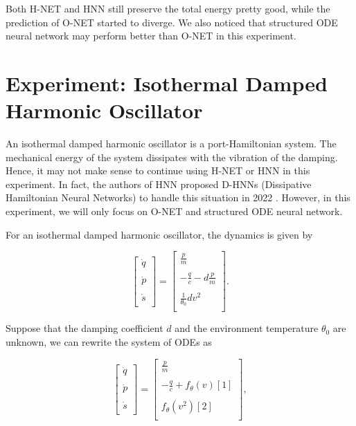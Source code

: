 \documentclass[
	parskip, 			   %
	twoside, 			   %
	DIV=14, 			   %
	BCOR=15.0mm, 		   %
	headsepline, 		   %
	open=right, 		   %
	captions=tableheading, %
	bibliography=totoc,    %
	numbers=noenddot       %
]{scrreprt}
\begin{document}
Both H-NET and HNN still preserve the total energy pretty good, while the prediction of O-NET started to diverge. We also noticed that structured ODE neural network may perform better than O-NET in this experiment.


\clearpage
\section{Experiment: Isothermal Damped Harmonic Oscillator}
An isothermal damped harmonic oscillator is a port-Hamiltonian system. The mechanical energy of the system dissipates with the vibration of the damping. Hence, it may not make sense to continue using H-NET or HNN in this experiment. In fact, the authors of HNN proposed D-HNNs (Dissipative Hamiltonian Neural Networks) to handle this situation in 2022 \cite{greydanus2022dissipative}. However, in this experiment, we will only focus on O-NET and structured ODE neural network.

For an isothermal damped harmonic oscillator, the dynamics is given by

\begin{equation}
    \label{eq:ODE_idho}
    \begin{bmatrix}
    \dot{q}\\
    \\
    \dot{p}\\
    \\
    \dot{s}\\
    \end{bmatrix}
    =
    \begin{bmatrix}
    \frac{p}{m}\\
    \\
    -\frac{q}{c}-d\frac{p}{m}\\
    \\
    \frac{1}{\theta_{0}} d v^2\\
    \end{bmatrix}.
\end{equation}

Suppose that the damping coefficient $d$ and the environment temperature $\theta_{0}$ are unknown, we can rewrite the system of ODEs as

\begin{equation}
    \label{eq:NeuralODE_idho}
    \begin{bmatrix}
    \dot{q}\\
    \\
    \dot{p}\\
    \\
    \dot{s}\\
    \end{bmatrix}
    =
    \begin{bmatrix}
    \frac{p}{m}\\
    \\
    -\frac{q}{c} + f_{\theta}(v)[1]\\
    \\
    f_{\theta}(v^2)[2]\\
    \end{bmatrix},
\end{equation}
\end{document}
